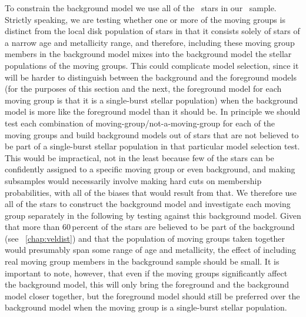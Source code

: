 To constrain the background model we use all of the \nstarsms\ stars
in our \Hipparcos\ sample. Strictly speaking, we are testing whether
one or more of the moving groups is distinct from the local disk
population of stars in that it consists solely of stars of a narrow
age and metallicity range, and therefore, including these moving group
members in the background model mixes into the background model the
stellar populations of the moving groups. This could complicate model
selection, since it will be harder to distinguish between the
background and the foreground models (for the purposes of this section
and the next, the foreground model for each moving group is that it is
a single-burst stellar population) when the background model is more
like the foreground model than it should be. In principle we should
test each combination of moving-group/not-a-moving-group for each of
the moving groups and build background models out of stars that are
not believed to be part of a single-burst stellar population in that
particular model selection test. This would be impractical, not in the
least because few of the stars can be confidently assigned to a
specific moving group or even background, and making subsamples would
necessarily involve making hard cuts on membership probabilities, with
all of the biases that would result from that. We therefore use all of
the stars to construct the background model and investigate each
moving group separately in the following by testing against this
background model. Given that more than 60\,percent of the stars are
believed to be part of the background
(see \chaptername~\ref{chap:veldist}) and that the population of
moving groups taken together would presumably span some range of age
and metallicity, the effect of including real moving group members in
the background sample should be small. It is important to note,
however, that even if the moving groups significantly affect the
background model, this will only bring the foreground and the
background model closer together, but the foreground model should
still be preferred over the background model when the moving group is
a single-burst stellar population.

